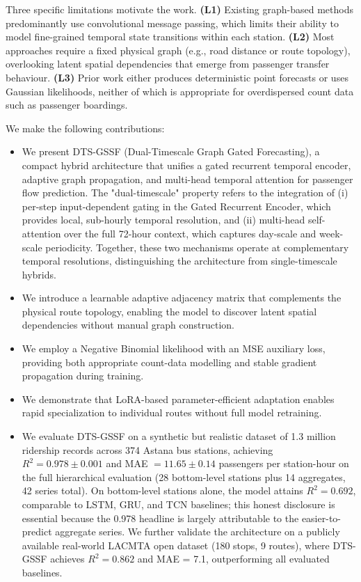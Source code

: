 Three specific limitations motivate the work. \textbf{(L1)} Existing graph-based methods predominantly use convolutional message passing, which limits their ability to model fine-grained temporal state transitions within each station. \textbf{(L2)} Most approaches require a fixed physical graph (e.g., road distance or route topology), overlooking latent spatial dependencies that emerge from passenger transfer behaviour. \textbf{(L3)} Prior work either produces deterministic point forecasts or uses Gaussian likelihoods, neither of which is appropriate for overdispersed count data such as passenger boardings.

We make the following contributions:
\begin{itemize}
    \item We present DTS-GSSF (Dual-Timescale Graph Gated Forecasting), a compact hybrid architecture that unifies a gated recurrent temporal encoder, adaptive graph propagation, and multi-head temporal attention for passenger flow prediction. The "dual-timescale" property refers to the integration of (i) per-step input-dependent gating in the Gated Recurrent Encoder, which provides local, sub-hourly temporal resolution, and (ii) multi-head self-attention over the full 72-hour context, which captures day-scale and week-scale periodicity. Together, these two mechanisms operate at complementary temporal resolutions, distinguishing the architecture from single-timescale hybrids.
    \item We introduce a learnable adaptive adjacency matrix that complements the physical route topology, enabling the model to discover latent spatial dependencies without manual graph construction.
    \item We employ a Negative Binomial likelihood with an MSE auxiliary loss, providing both appropriate count-data modelling and stable gradient propagation during training.
    \item We demonstrate that LoRA-based parameter-efficient adaptation enables rapid specialization to individual routes without full model retraining.
    \item We evaluate DTS-GSSF on a synthetic but realistic dataset of 1.3 million ridership records across 374 Astana bus stations, achieving $R^2 = 0.978 \pm 0.001$ and MAE $= 11.65 \pm 0.14$ passengers per station-hour on the full hierarchical evaluation (28 bottom-level stations plus 14 aggregates, 42 series total). On bottom-level stations alone, the model attains $R^2 = 0.692$, comparable to LSTM, GRU, and TCN baselines; this honest disclosure is essential because the 0.978 headline is largely attributable to the easier-to-predict aggregate series. We further validate the architecture on a publicly available real-world LACMTA open dataset (180 stops, 9 routes), where DTS-GSSF achieves $R^2 = 0.862$ and MAE = 7.1, outperforming all evaluated baselines.
\end{itemize}

